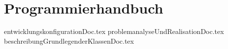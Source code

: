 \part{Programmierhandbuch}
{entwicklungskonfigurationDoc.tex}
{problemanalyseUndRealisationDoc.tex}
{beschreibungGrundlegenderKlassenDoc.tex}

